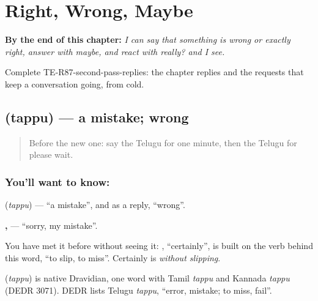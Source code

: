 
\chapter{Right, Wrong, Maybe}
\label{ch:te-right-wrong-maybe}

\begin{chapteropening}
\textbf{By the end of this chapter:} \emph{I can say that something is wrong or exactly right, answer with maybe, and react with really? and I see.}

Complete TE-R87-second-pass-replies: the chapter replies and the requests that keep a conversation going, from cold.
\end{chapteropening}

\section[\texorpdfstring{\te{తప్పు} (tappu)}{తప్పు (tappu)}]{ (tappu) — a mistake; wrong}

\label{lesson:TE-C87-mistake}



\begin{quote}
Before the new one: say the Telugu for one minute, then the Telugu for please wait.
\end{quote}

\subsection*{You'll want to know: }
\textbf{} (\emph{tappu}) — \textquotedblleft{}a mistake\textquotedblright{}, and as a reply, \textquotedblleft{}wrong\textquotedblright{}.

\textbf{,  } — \textquotedblleft{}sorry, my mistake\textquotedblright{}.

You have met it before without seeing it: \textbf{}, \textquotedblleft{}certainly\textquotedblright{}, is built on the verb behind this word, \textquotedblleft{}to slip, to miss\textquotedblright{}. Certainly is \emph{without slipping}.

\begin{cousinweb}
\textbf{} (\emph{tappu}) is native Dravidian, one word with Tamil \emph{tappu} and Kannada \emph{tappu} (DEDR 3071). DEDR lists Telugu \emph{tappu}, \textquotedblleft{}error, mistake; to miss, fail\textquotedblright{}.
\end{cousinweb}

